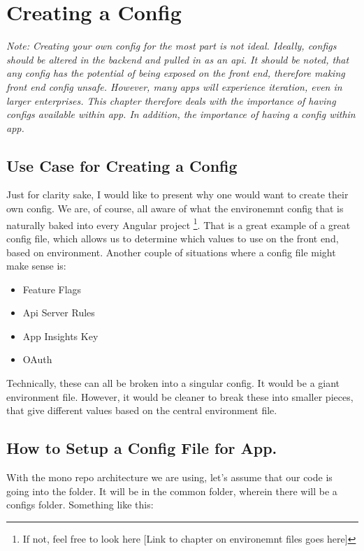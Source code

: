 \maketitle{}
\section{ Creating a Config }

\textit{ Note: Creating your own config for the most part is not ideal. Ideally,
configs should be altered in the backend and pulled in as an api. It should be
noted, that any config has the potential of being exposed on the front end,
therefore making front end config unsafe. However, many apps will experience
iteration, even in larger enterprises. This chapter therefore deals with the
importance of having configs available within app. In addition, the importance
of having a config within app.}

\subsection{ Use Case for Creating a Config }
Just for clarity sake, I would like to present why one would want to create
their own config. We are, of course, all aware of what the environemnt config
that is naturally baked into every Angular project \footnote{If not, feel free
to look here [Link to chapter on environemnt files goes here]}. That is a great
example of a great config file, which allows us to determine which values to
use on the front end, based on environment. Another couple of situations where
a config file might make sense is:
\begin{itemize}
  \item Feature Flags
  \item Api Server Rules
  \item App Insights Key
  \item OAuth
\end{itemize}

Technically, these can all be broken into a singular config. It would be a giant
environment file. However, it would be cleaner to break these into smaller
pieces, that give different values based on the central environment file.

\subsection{ How to Setup a Config File for App. }

With the mono repo architecture we are using, let's assume that our code is
going into the \appNameKebabCase{} folder. It will be in the common folder,
wherein there will be a configs folder. Something like this:

